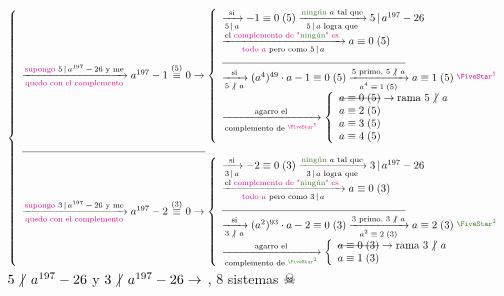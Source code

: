 $\llave{l}{
		\flecha{\magenta{supongo} $5\divideA a^{197} - 26$ y me}[\magenta{quedo con el complemento}]
		a^{197} - 1 \conga{5} 0
		\to
		\llave{l}{
			\flecha{si}[$5 \divideA a$]
			\congruencia{-1}{0}{5}
			\flecha{\green{ningún} $a$ tal que}[$5 \divideA a$ logra que] 5 \divideA a^{197} - 26 \\
			\flecha{el \magenta{complemento de "\green{ningún}" es }}[\magenta{todo $a$} pero como $5\divideA a$]
			\congruencia{a}{0}{5}\\
			\separadorCorto
			\flecha{si}[$5 \noDivide a$]
			\congruencia{(a^4)^{49} \cdot a - 1}{0}{5}
			\flecha{5 primo, $5\noDivide a$}[$\congruencia{a^4}{1}{5}$]
			\congruencia{a}{1}{5}\llamada1\\
			\flecha{agarro el}[complemento de $\llamada1$]
			\llave{l}{
				\hbox{\sout{$\congruencia{a}{0}{5}$}} \to \text{rama $5\noDivide a$} \\
				\congruencia{a}{2}{5} \\
				\congruencia{a}{3}{5} \\
				\congruencia{a}{4}{5} \\
			}
		}\\

		\separadorCorto

		\flecha{\magenta{supongo} $3\divideA a^{197} - 26$ y me}[\magenta{quedo con el complemento}]
		a^{197} - 2 \conga{3} 0
		\to
		\llave{l}{
			\flecha{si}[$3 \divideA a$]
			\congruencia{-2}{0}{3}
			\flecha{\green{ningún} $a$ tal que}[$3 \divideA a$ logra que] 3 \divideA a^{197} - 26 \\
			\flecha{el \magenta{complemento de "\green{ningún}" es }}[\magenta{todo $a$} pero como $3\divideA a$]
			\congruencia{a}{0}{3}\\
			\separadorCorto
			\flecha{si}[$3 \noDivide a$]
			\congruencia{(a^2)^{93} \cdot a - 2}{0}{3}
			\flecha{3 primo, $3\noDivide a$}[$\congruencia{a^2}{2}{3}$]
			\congruencia{a}{2}{3}\llamada2\\
			\flecha{agarro el}[complemento de $\llamada2$]
			\llave{l}{
				\hbox{\sout{$\congruencia{a}{0}{3}$}} \to \text{rama $3\noDivide a$} \\
				\congruencia{a}{1}{3}
			}
		}\\

	}$\\
 $5 \noDivide a^{197} - 26$ y
$3 \noDivide a^{197} - 26 \to $
, 8 sistemas $\skull$ \\


